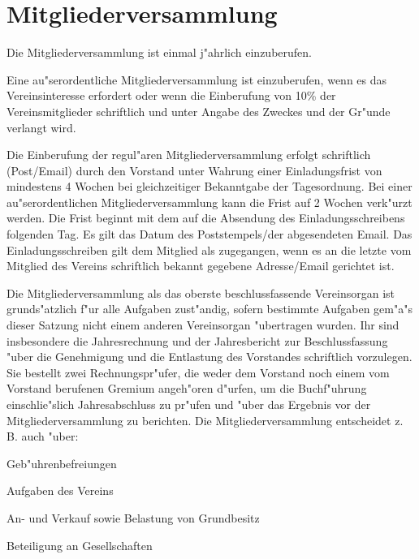 \documentclass[a5paper, ngerman, 10pt]{scrreprt}
\begin{document}
\section{Mitgliederversammlung}
\begin{compactenum}[(1)]
    \item Die Mitgliederversammlung ist einmal j"ahrlich einzuberufen.
    \item Eine au"serordentliche Mitgliederversammlung ist einzuberufen, wenn es
        das Vereinsinteresse erfordert oder wenn die Einberufung von 10\% der
        Vereinsmitglieder schriftlich und unter Angabe des Zweckes und der
        Gr"unde verlangt wird.
    \item Die Einberufung der regul"aren Mitgliederversammlung erfolgt
        schriftlich (Post/Email) durch den Vorstand unter Wahrung einer
        Einladungsfrist von mindestens 4 Wochen bei gleichzeitiger Bekanntgabe
        der Tagesordnung. Bei einer au"serordentlichen Mitgliederversammlung
        kann die Frist auf 2 Wochen verk"urzt werden. Die Frist beginnt mit dem
        auf die Absendung des Einladungsschreibens folgenden Tag. Es gilt das
        Datum des Poststempels/der abgesendeten Email. Das Einladungsschreiben
        gilt dem Mitglied als zugegangen, wenn es an die letzte vom Mitglied des
        Vereins schriftlich bekannt gegebene Adresse/Email gerichtet ist.
    \item Die Mitgliederversammlung als das oberste beschlussfassende
        Vereinsorgan ist grunds"atzlich f"ur alle Aufgaben zust"andig, sofern
        bestimmte Aufgaben gem"a"s dieser Satzung nicht einem anderen
        Vereinsorgan "ubertragen wurden. Ihr sind insbesondere die
        Jahresrechnung und der Jahresbericht zur Beschlussfassung "uber die
        Genehmigung und die Entlastung des Vorstandes schriftlich vorzulegen.
        Sie bestellt zwei Rechnungspr"ufer, die weder dem Vorstand noch einem
        vom Vorstand berufenen Gremium angeh"oren d"urfen, um die Buchf"uhrung
        einschlie"slich Jahresabschluss zu pr"ufen und "uber das Ergebnis vor
        der Mitgliederversammlung zu berichten. Die Mitgliederversammlung
        entscheidet z. B. auch "uber:
    \begin{compactenum}[a.]
        \item Geb"uhrenbefreiungen
        \item Aufgaben des Vereins
        \item An- und Verkauf sowie Belastung von Grundbesitz
        \item Beteiligung an Gesellschaften

\end{compactenum}
\end{compactenum}
\end{document}
